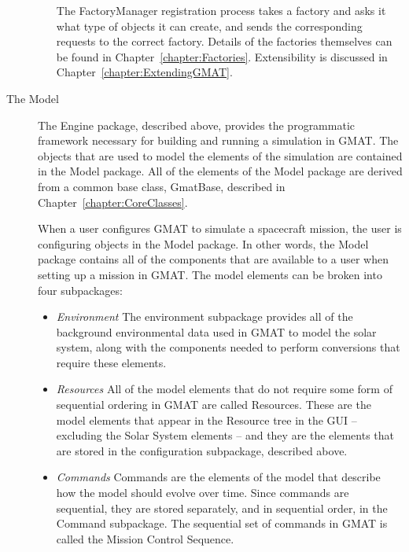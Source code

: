 \begin{description}
\begin{itemize}
    The FactoryManager registration process takes a factory and asks it what type of objects it can
create, and sends the corresponding requests to the correct factory.  Details of the factories
themselves can be found in Chapter~\ref{chapter:Factories}.  Extensibility is discussed in
Chapter~\ref{chapter:ExtendingGMAT}.
  \end{itemize}
  \item[The Model] The Engine package, described above, provides the programmatic
framework necessary for building and running a simulation in GMAT.  The objects that are used to
model the elements of the simulation are contained in the Model package.  All of the elements of the
Model package are derived from a common base class, GmatBase, described in
Chapter~\ref{chapter:CoreClasses}.

  When a user configures GMAT to simulate a spacecraft mission, the user is configuring objects in
the Model package.  In other words, the Model package contains all of the components that are
available to a user when setting up a mission in GMAT.  The model elements can be broken into four
subpackages:

  \begin{itemize}
    \item \textit{Environment} The environment subpackage provides all of
the background environmental data used in GMAT to model the solar system, along with the components
needed to perform conversions that require these elements.
    \item \textit{Resources} All of the model elements that do not require
some form of sequential ordering in GMAT are called Resources.  These are the model elements that
appear in the Resource tree in the GUI -- excluding the Solar System elements -- and they are the
elements that are stored in the configuration subpackage, described above.
    \item \textit{Commands} Commands are the elements of the model that
describe how the model should evolve over time.  Since commands are sequential, they are stored
separately, and in sequential order, in the Command subpackage.  The sequential set of commands in
GMAT is called the Mission Control Sequence.


\end{itemize}
\end{description}
